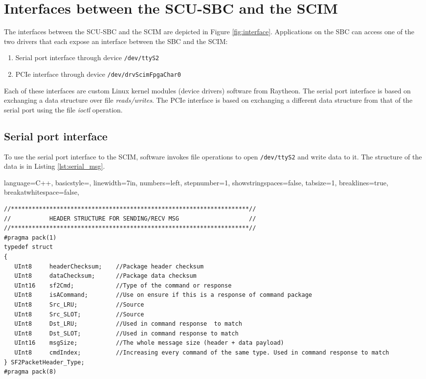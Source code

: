 \documentclass[12pt]{article}
\begin{document}
{\section{Interfaces between the SCU-SBC and the SCIM}
\label{sec:interfaces}

The interfaces between the SCU-SBC and the SCIM are depicted in Figure \ref{fig:interface}.
Applications on the SBC can access one of the two drivers that each expose an interface between
the SBC and the SCIM:

\begin{enumerate}
    \item Serial port interface through device \texttt{/dev/ttyS2}
    \item PCIe interface through device \texttt{/dev/drvScimFpgaChar0}
\end{enumerate}


Each of these interfaces are custom Linux kernel modules (device drivers) software from
Raytheon.
The serial port interface is based on exchanging a data structure over file \emph{reads/writes}.
The PCIe interface is based on exchanging a different data structure from that of the serial port using the file \emph{ioctl} operation.

\subsection{Serial port interface}

To use the serial port interface to the SCIM, software invokes file operations to open \texttt{/dev/ttyS2} and write data to it. The structure
of the data is in Listing \ref{lst:serial_msg}.

\lstset
{
    language=C++,
    basicstyle=\footnotesize\ttfamily,
    linewidth=7in,
    numbers=left,
    stepnumber=1,
    showstringspaces=false,
    tabsize=1,
    breaklines=true,
    breakatwhitespace=false,
}

\begin{adjustwidth}{0.0in}{0.0in}
\begin{lstlisting}[firstnumber=143, caption={\texttt{exeCswBoot/SerialCommonTypes.h} Serial Port message (variable length)}, label={lst:serial_msg}]
//********************************************************************//
//           HEADER STRUCTURE FOR SENDING/RECV MSG                    //
//********************************************************************//
#pragma pack(1)
typedef struct
{
   UInt8     headerChecksum;    //Package header checksum
   UInt8     dataChecksum;      //Package data checksum
   UInt16    sf2Cmd;            //Type of the command or response
   UInt8     isACommand;        //Use on ensure if this is a response of command package
   UInt8     Src_LRU;           //Source
   UInt8     Src_SLOT;          //Source
   UInt8     Dst_LRU;           //Used in command response  to match
   UInt8     Dst_SLOT;          //Used in command response to match
   UInt16    msgSize;           //The whole message size (header + data payload)
   UInt8     cmdIndex;          //Increasing every command of the same type. Used in command response to match
} SF2PacketHeader_Type;
#pragma pack(8)


\end{lstlisting}
\end{adjustwidth}}
\end{document}
